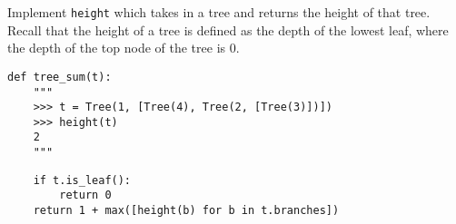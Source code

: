\begin{blocksection}
\question Implement \lstinline$height$ which takes in a 
tree and returns the height of that tree. Recall that the
height of a tree is defined as the depth of the lowest leaf,
where the depth of the top node of the tree is 0.

\begin{lstlisting}
def tree_sum(t):
    """
    >>> t = Tree(1, [Tree(4), Tree(2, [Tree(3)])])
    >>> height(t)
    2
    """
\end{lstlisting}

\begin{solution}[2in]
\begin{lstlisting}
    if t.is_leaf():
        return 0
    return 1 + max([height(b) for b in t.branches])
\end{lstlisting}
\end{solution}
\end{blocksection}

